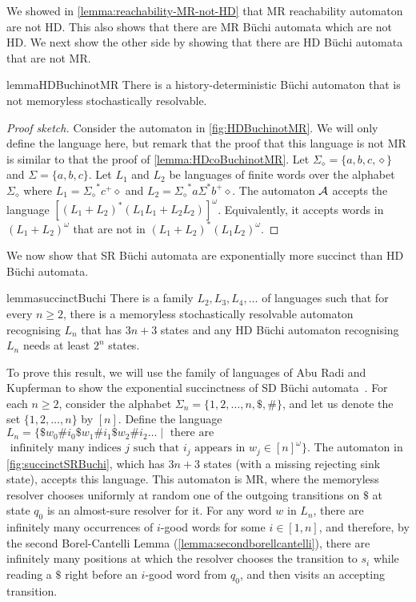 We showed in \cref{lemma:reachability-MR-not-HD} that MR reachability automaton are not HD. This also shows that there are MR B\"uchi automata which are not HD. We next show the other side by showing that there are HD B\"uchi automata that are not MR.
\begin{restatable}{lemma}{HDBuchinotMR}\label{lemma:HDBuchinotMR}
    There is a history-deterministic B\"uchi automaton that is not memoryless stochastically resolvable.
\end{restatable}
\begin{proof}[Proof sketch]
    Consider the automaton in \cref{fig:HDBuchinotMR}. We will only define the language here, but remark that the proof that this language is not MR is similar to that the proof of \cref{lemma:HDcoBuchinotMR}. 
    Let  $\Sigma_\diamond = \{a,b,c,\diamond\}$ and $\Sigma = \{a,b,c\}$. Let $L_1$ and $L_2$ be languages of finite words over the alphabet $\Sigma_\diamond$ where $L_1 =   {\Sigma_\diamond}^*  c^+\diamond $ and $L_2 = {\Sigma_\diamond}^* a \Sigma^* b^+\diamond$. 
    The automaton $\mathcal{A}$ accepts the language $\left[(L_1+L_2)^*(L_1L_1+L_2L_2)\right]^\omega$. Equivalently, it accepts words in $(L_1+L_2)^\omega$ that are not in  $(L_1+L_2)^*(L_1L_2)^\omega$.  
\end{proof}
 
We now show that SR B\"uchi automata  are exponentially more succinct than HD B\"uchi automata. 
\begin{restatable}{lemma}{succinctBuchi}\label{lemma:succinctBuchi}
    There is a family $L_2,L_3,L_4,\dots$ of languages such that for every $n\geq 2$, there is a memoryless stochastically resolvable automaton recognising $L_n$  that has $3n+3$ states and any HD B\"uchi automaton recognising $L_n$ needs at least $2^n$ states. 
\end{restatable}
To prove this result, we will use the family of languages of Abu Radi and Kupferman to show the exponential succinctness of SD B\"uchi automata~\cite[Theorem 5]{AK23}. For each $n\geq 2$, consider the alphabet $\Sigma_n=\{1,2,\dots,n,\$,\#\}$, and let us denote the set $\{1,2,\dots,n\}$ by $[n]$. 
Define the language $L_n=\{\$w_0\#i_0\$w_1\#i_1\$w_2\#i_2\dots \mid \text{~there are}$ $\text{ infinitely many indices $j$ such that $i_j$ appears in $w_j \in [n]^{\omega}$}\}$. The automaton in \cref{fig:succinctSRBuchi}, which has $3n+3$ states (with a missing rejecting sink state), accepts this language. This automaton is MR, where the memoryless resolver chooses uniformly at random one of the outgoing transitions on $\$$ at state $q_0$ is an almost-sure resolver for it. For any word $w$ in $L_n$, there are infinitely many occurrences of $i$-good words for some $i \in [1,n]$, and therefore, by the second Borel-Cantelli Lemma (\cref{lemma:secondborellcantelli}), there are infinitely many positions at which the resolver chooses the transition to $s_i$ while reading a $\$$ right before an $i$-good word from $q_0$, and then visits an accepting transition. 
